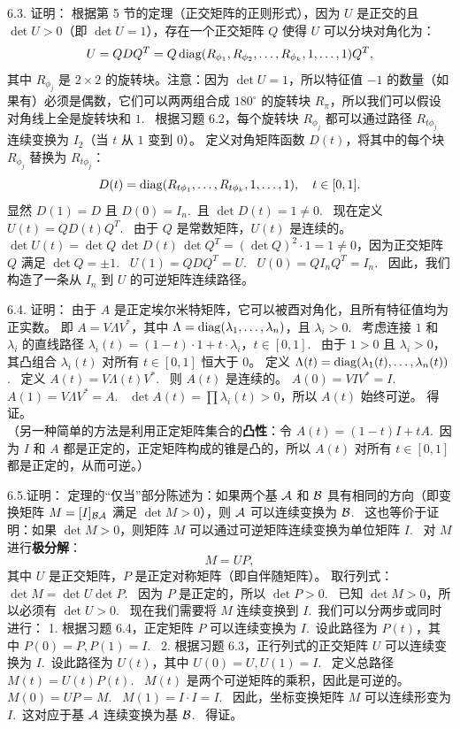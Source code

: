 \begin{exer}
6.3. 证明：
根据第 5 节的定理（正交矩阵的正则形式），因为 $U$ 是正交的且 $\det U > 0$（即 $\det U = 1$），存在一个正交矩阵 $Q$ 使得 $U$ 可以分块对角化为：
$$ U = Q D Q^T = Q \operatorname{diag}(R_{\phi_1}, R_{\phi_2}, \dots, R_{\phi_k}, 1, \dots, 1) Q^T, $$
其中 $R_{\phi_j}$ 是 $2 \times 2$ 的旋转块。注意：因为 $\det U = 1$，所以特征值 $-1$ 的数量（如果有）必须是偶数，它们可以两两组合成 $180^\circ$ 的旋转块 $R_\pi$，所以我们可以假设对角线上全是旋转块和 $1$.~
根据习题 6.2，每个旋转块 $R_{\phi_j}$ 都可以通过路径 $R_{t\phi_j}$ 连续变换为 $I_2$（当 $t$ 从 $1$ 变到 $0$）。
定义对角矩阵函数 $D(t)$，将其中的每个块 $R_{\phi_j}$ 替换为 $R_{t\phi_j}$：
$$ D(t) = \operatorname{diag}(R_{t\phi_1}, \dots, R_{t\phi_k}, 1, \dots, 1), \quad t \in [0, 1]. $$
显然 $D(1) = D$ 且 $D(0) = I_n$.~且 $\det D(t) = 1 \neq 0$.~
现在定义 $U(t) = Q D(t) Q^T$.~
由于 $Q$ 是常数矩阵，$U(t)$ 是连续的。
$\det U(t)=\det Q\,\det D(t)\,\det Q^T=(\det Q)^2\cdot1=1\neq0$，因为正交矩阵 $Q$ 满足 $\det Q=\pm1$.~
$U(1) = Q D Q^T = U$.~
$U(0) = Q I_n Q^T = I_n$.~
因此，我们构造了一条从 $I_n$ 到 $U$ 的可逆矩阵连续路径。

6.4. 证明：
由于 $A$ 是正定埃尔米特矩阵，它可以被酉对角化，且所有特征值均为正实数。
即 $A = V \Lambda V^*$，其中 $\Lambda = \operatorname{diag}(\lambda_1, \dots, \lambda_n)$，且 $\lambda_i > 0$.~
考虑连接 $1$ 和 $\lambda_i$ 的直线路径 $\lambda_i(t) = (1-t) \cdot 1 + t \cdot \lambda_i$，$t \in [0, 1]$.~
由于 $1 > 0$ 且 $\lambda_i > 0$，其凸组合 $\lambda_i(t)$ 对所有 $t \in [0, 1]$ 恒大于 0。
定义 $\Lambda(t) = \operatorname{diag}(\lambda_1(t), \dots, \lambda_n(t))$.~
定义 $A(t) = V \Lambda(t) V^*$.~
则 $A(t)$ 是连续的。
$A(0) = V I V^* = I$.~
$A(1) = V \Lambda V^* = A$.~
$\det A(t) = \prod \lambda_i(t) > 0$，所以 $A(t)$ 始终可逆。
得证。
\\
（另一种简单的方法是利用正定矩阵集合的\textbf{凸性}：令 $A(t) = (1-t)I + tA$.~因为 $I$ 和 $A$ 都是正定的，正定矩阵构成的锥是凸的，所以 $A(t)$ 对所有 $t \in [0,1]$ 都是正定的，从而可逆。）

6.5.证明：
定理的“仅当”部分陈述为：如果两个基 $\mathcal{A} $ 和 $\mathcal{B} $ 具有相同的方向（即变换矩阵 $M = [I]_{\mathcal{B} \mathcal{A} }$ 满足 $\det M > 0$），则 $\mathcal{A} $ 可以连续变换为 $\mathcal{B} $.~
这也等价于证明：如果 $\det M > 0$，则矩阵 $M$ 可以通过可逆矩阵连续变换为单位矩阵 $I$.~
对 $M$ 进行\textbf{极分解}：
$$ M = U P, $$
其中 $U$ 是正交矩阵，$P$ 是正定对称矩阵（即自伴随矩阵）。
取行列式：$\det M = \det U \det P$.~
因为 $P$ 是正定的，所以 $\det P > 0$.~
已知 $\det M > 0$，所以必须有 $\det U > 0$.~
现在我们需要将 $M$ 连续变换到 $I$.~我们可以分两步或同时进行：
1.  根据习题 6.4，正定矩阵 $P$ 可以连续变换为 $I$.~设此路径为 $P(t)$，其中 $P(0)=P, P(1)=I$.~
2.  根据习题 6.3，正行列式的正交矩阵 $U$ 可以连续变换为 $I$.~设此路径为 $U(t)$，其中 $U(0)=U, U(1)=I$.~
定义总路径 $M(t) = U(t) P(t)$.~
$M(t)$ 是两个可逆矩阵的乘积，因此是可逆的。
$M(0) = U P = M$.~
$M(1) = I \cdot I = I$.~
因此，坐标变换矩阵 $M$ 可以连续形变为 $I$.~这对应于基 $\mathcal{A} $ 连续变换为基 $\mathcal{B} $.~
得证。

\vspace{5ex}


\end{exer}









